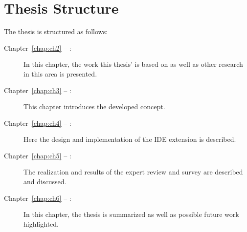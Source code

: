 \section*{Thesis Structure}
The thesis is structured as follows:
\begin{description}
	\item[Chapter~\ref{chap:ch2} -- :] In this chapter, the work this thesis' is based on as well as other research in this area is presented.
	\item[Chapter~\ref{chap:ch3} -- :] This chapter introduces the developed concept.
	\item[Chapter~\ref{chap:ch4} -- :] Here the design and implementation of the \gls{IDE} extension is described.
	\item[Chapter~\ref{chap:ch5} -- :] The realization and results of the expert review and survey are described and discussed.
	\item[Chapter~\ref{chap:ch6} -- :] In this chapter, the thesis is summarized as well as possible future work highlighted.
\end{description}